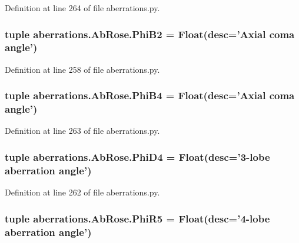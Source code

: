 Definition at line 264 of file aberrations.\-py.

\hypertarget{classaberrations_1_1_ab_rose_a6d2ad1d6f5c338d647ed7e35f39b7e0b}{
\subsubsection[{Phi\-B2}]{\setlength{\rightskip}{0pt plus 5cm}tuple aberrations.\-Ab\-Rose.\-Phi\-B2 = Float(desc='Axial coma {\bf angle}')\hspace{0.3cm}{\ttfamily [static]}}}\label{classaberrations_1_1_ab_rose_a6d2ad1d6f5c338d647ed7e35f39b7e0b}


Definition at line 258 of file aberrations.\-py.

\hypertarget{classaberrations_1_1_ab_rose_afb3143dccb0c1f6b4b15eaef3616f953}{
\subsubsection[{Phi\-B4}]{\setlength{\rightskip}{0pt plus 5cm}tuple aberrations.\-Ab\-Rose.\-Phi\-B4 = Float(desc='Axial coma {\bf angle}')\hspace{0.3cm}{\ttfamily [static]}}}\label{classaberrations_1_1_ab_rose_afb3143dccb0c1f6b4b15eaef3616f953}


Definition at line 263 of file aberrations.\-py.

\hypertarget{classaberrations_1_1_ab_rose_ae946b39d53484d8e706e4c87cadc2d66}{
\subsubsection[{Phi\-D4}]{\setlength{\rightskip}{0pt plus 5cm}tuple aberrations.\-Ab\-Rose.\-Phi\-D4 = Float(desc='3-\/lobe {\bf aberration} {\bf angle}')\hspace{0.3cm}{\ttfamily [static]}}}\label{classaberrations_1_1_ab_rose_ae946b39d53484d8e706e4c87cadc2d66}


Definition at line 262 of file aberrations.\-py.

\hypertarget{classaberrations_1_1_ab_rose_aa114d5d5de6445de0a55f47af937c009}{
\subsubsection[{Phi\-R5}]{\setlength{\rightskip}{0pt plus 5cm}tuple aberrations.\-Ab\-Rose.\-Phi\-R5 = Float(desc='4-\/lobe {\bf aberration} {\bf angle}')\hspace{0.3cm}{\ttfamily [static]}}}\label{classaberrations_1_1_ab_rose_aa114d5d5de6445de0a55f47af937c009}


